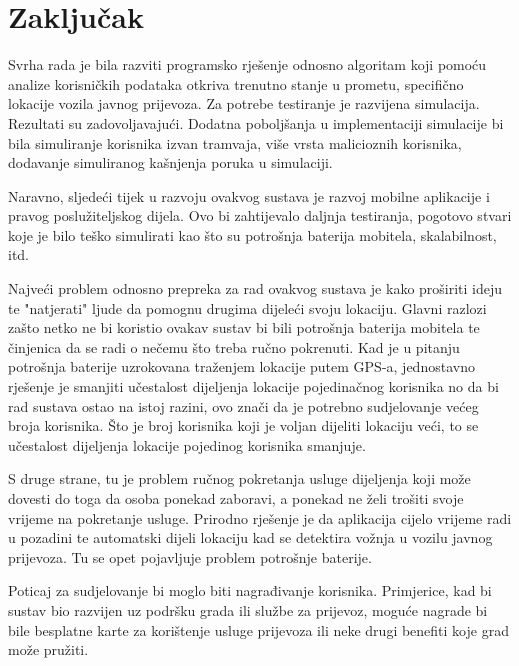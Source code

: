 \documentclass[times, utf8, diplomski]{fer}
\begin{document}
\chapter{Zaključak}
Svrha rada je bila razviti programsko rješenje odnosno algoritam koji pomoću analize korisničkih podataka otkriva trenutno stanje u prometu, specifično lokacije vozila javnog prijevoza. Za potrebe testiranje je razvijena simulacija. Rezultati su zadovoljavajući. Dodatna poboljšanja u implementaciji simulacije bi bila simuliranje korisnika izvan tramvaja, više vrsta malicioznih korisnika, dodavanje simuliranog kašnjenja poruka u simulaciji.

Naravno, sljedeći tijek u razvoju ovakvog sustava je razvoj mobilne aplikacije i pravog poslužiteljskog dijela. Ovo bi zahtijevalo daljnja testiranja, pogotovo stvari koje je bilo teško simulirati kao što su potrošnja baterija mobitela, skalabilnost, itd.

Najveći problem odnosno prepreka za rad ovakvog sustava je kako proširiti ideju te "natjerati" ljude da pomognu drugima dijeleći svoju lokaciju. Glavni razlozi zašto netko ne bi koristio ovakav sustav bi bili potrošnja baterija mobitela te činjenica da se radi o nečemu što treba ručno pokrenuti. Kad je u pitanju potrošnja baterije uzrokovana traženjem lokacije putem GPS-a, jednostavno rješenje je smanjiti učestalost dijeljenja lokacije pojedinačnog korisnika no da bi rad sustava ostao na istoj razini, ovo znači da je potrebno sudjelovanje većeg broja korisnika. Što je broj korisnika koji je voljan dijeliti lokaciju veći, to se učestalost dijeljenja lokacije pojedinog korisnika smanjuje.

S druge strane, tu je problem ručnog pokretanja usluge dijeljenja koji može dovesti do toga da osoba ponekad zaboravi, a ponekad ne želi trošiti svoje vrijeme na pokretanje usluge. Prirodno rješenje je da aplikacija cijelo vrijeme radi u pozadini te automatski dijeli lokaciju kad se detektira vožnja u vozilu javnog prijevoza. Tu se opet pojavljuje problem potrošnje baterije. 

Poticaj za sudjelovanje bi moglo biti nagrađivanje korisnika. Primjerice, kad bi sustav bio razvijen uz podršku grada ili službe za prijevoz, moguće nagrade bi bile besplatne karte za korištenje usluge prijevoza ili neke drugi benefiti koje grad može pružiti.





\end{document}
